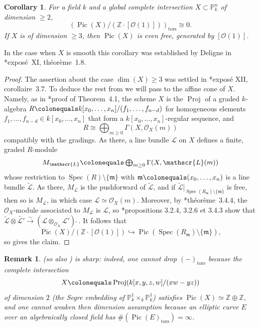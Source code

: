 \documentclass[11pt, reqno]{amsart}
\newcommand{\bP}{\mathbb{P}}
\newcommand{\bZ}{\mathbb{Z}}
\newcommand{\fm}{\mathfrak{m}}
\newcommand{\sL}{\mathscr{L}}
\newcommand{\sO}{\mathscr{O}}
\DeclareMathOperator{\Pic}{Pic}		%
\DeclareMathOperator{\Proj}{Proj}		%
\DeclareMathOperator{\Spec}{Spec}		%
\newcommand{\ce}{\colonequals}
\newcommand{\hra}{\hookrightarrow}
\newcommand{\isomto}{\overset{\sim}{\longrightarrow}}
\newcommand{\tensor}{\otimes} 			%
\newcommand{\tors}{\mathrm{tors}}		%
\newcommand{\wt}{\widetilde}
\newcommand{\tst}{\textstyle}
\newcommand{\bpf}{\begin{proof}}
\newcommand{\epf}{\end{proof}}
\newcommand{\bcor}{\begin{cor}}
\newcommand{\ecor}{\end{cor}}
\newcommand{\brem}{\begin{rem}}
\newcommand{\erem}{\end{rem}}
\numberwithin{equation}{numberingbase}
\theoremstyle{thms}
\newtheorem{cor}[numberingbase]{Corollary}
\theoremstyle{claims}
\theoremstyle{defs}
\newtheorem{rem}[numberingbase]{Remark}
\theoremstyle{thms}
\theoremstyle{defs}
\theoremstyle{subsection-tweak}
\theoremstyle{subsection-tweak}
\begin{document}
\bcor \label{global-ci-cor}
For a field $k$ and a global complete intersection $X \subset \bP^n_k$ of dimension $\ge 2$,  
\[
(\Pic(X)/(\bZ \cdot [\sO(1)]))_\tors \cong 0.
\]
If $X$ is of dimension $\ge 3$, then $\Pic(X)$ is even free, generated by $[\sO(1)]$.
\ecor

In the case when $X$ is smooth this corollary was established by Deligne in \cite{SGA7II}*{expos\'{e}~XI, th\'{e}or\`{e}me~1.8}.

\bpf
The assertion about the case $\dim(X) \ge 3$ was settled in \cite{SGA2new}*{expos\'{e} XII, corollaire~3.7}. 
To deduce the rest from  we will pass to the affine cone of $X$. Namely, as in \cite{Grothendieck-Lefschetz}*{proof of Theorem~4.1}, the scheme $X$ is the $\Proj$ of a graded $k$-algebra $R\ce k[x_0, \dotsc, x_n]/(f_1, \dotsc, f_{n - d})$ for homogeneous elements $f_1, \dotsc, f_{n - d} \in k[x_0, \dotsc, x_n]$ that form a $k[x_0, \dotsc, x_n]$-regular sequence, and 
\[
\tst R \cong \bigoplus_{m \ge 0} \Gamma(X, \sO_X(m))
\]
compatibly with the gradings. As there, a line bundle $\sL$ on $X$ defines a finite, graded $R$-module 
\[
\tst M_\sL \ce \bigoplus_{m \ge 0} \Gamma(X, \sL(m))
\] 
whose restriction to $\Spec(R) \setminus \{ \fm\}$ with $\fm \ce (x_0, \dotsc, x_n)$ is a line bundle $\wt{\sL}$. As there, $M_\sL$ is the pushforward of $\wt{\sL}$, and if $\wt{\sL}|_{\Spec(R_\fm)\setminus \{\fm\}}$ is free, then so is $M_\sL$, %
in which case $\sL \simeq \sO_X(m)$. Moreover, by \cite{EGAII}*{th\'{e}or\`{e}me~3.4.4}, the $\sO_X$-module associated to $M_\sL$ is $\sL$, so \cite{EGAII}*{propositions 3.2.4, 3.2.6 et 3.4.3} show that $\wt{\sL} \tensor \wt{\sL'} \isomto (\sL \tensor_{\sO_X} \sL')\wt{\ \,}$. It follows that 
\[
\tst \Pic(X)/(\bZ \cdot [\sO(1)]) \hra \Pic(\Spec(R_\fm) \setminus \{ \fm\}),
\]
so  gives the claim. 
\epf



\brem\label{eg:from-Hartshorne}
 (so also ) %
is sharp: indeed, one cannot drop $(-)_\tors$ because the complete intersection 
\[
X\ce \Proj(k[ x, y, z, w]/(xw - yz))
\]
of dimension $2$ (the Segre embedding of $\bP^1_k \times_k \bP^1_k$) satisfies $\Pic(X) \simeq \bZ \oplus \bZ$, %
and one cannot weaken then dimension assumption because an elliptic curve $E$  over an algebraically closed field has $\#(\Pic(E)_\tors) = \infty$.
\erem
\end{document}

